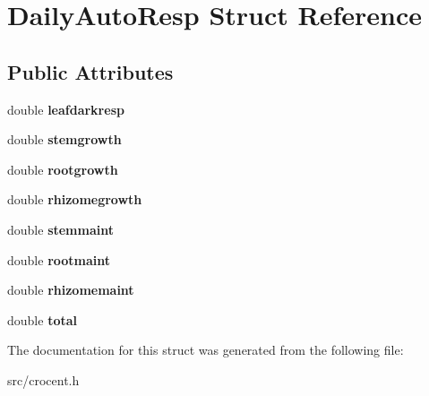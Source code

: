 \hypertarget{struct_daily_auto_resp}{\section{Daily\-Auto\-Resp Struct Reference}
\label{struct_daily_auto_resp}
}
\subsection*{Public Attributes}
\begin{DoxyCompactItemize}
\item 
\hypertarget{struct_daily_auto_resp_a7b3d71eb9710ec545f8c500adc66d3a8}{double {\bfseries leafdarkresp}}\label{struct_daily_auto_resp_a7b3d71eb9710ec545f8c500adc66d3a8}

\item 
\hypertarget{struct_daily_auto_resp_aacbeab3d4a1ce659e2e8c70bb43df8b3}{double {\bfseries stemgrowth}}\label{struct_daily_auto_resp_aacbeab3d4a1ce659e2e8c70bb43df8b3}

\item 
\hypertarget{struct_daily_auto_resp_a25cd37ac3feeff029a906382a25f2789}{double {\bfseries rootgrowth}}\label{struct_daily_auto_resp_a25cd37ac3feeff029a906382a25f2789}

\item 
\hypertarget{struct_daily_auto_resp_acf313fd8f2f08bb90ae009339afa1f68}{double {\bfseries rhizomegrowth}}\label{struct_daily_auto_resp_acf313fd8f2f08bb90ae009339afa1f68}

\item 
\hypertarget{struct_daily_auto_resp_aa02f9f89f49c141780116bd58c87bba7}{double {\bfseries stemmaint}}\label{struct_daily_auto_resp_aa02f9f89f49c141780116bd58c87bba7}

\item 
\hypertarget{struct_daily_auto_resp_a18d9726277242f4eca32d434e8c28460}{double {\bfseries rootmaint}}\label{struct_daily_auto_resp_a18d9726277242f4eca32d434e8c28460}

\item 
\hypertarget{struct_daily_auto_resp_a91f169a87d8f642b777bae26eafb11a5}{double {\bfseries rhizomemaint}}\label{struct_daily_auto_resp_a91f169a87d8f642b777bae26eafb11a5}

\item 
\hypertarget{struct_daily_auto_resp_adc9c45113bc62bb7b974130b863991cb}{double {\bfseries total}}\label{struct_daily_auto_resp_adc9c45113bc62bb7b974130b863991cb}

\end{DoxyCompactItemize}


The documentation for this struct was generated from the following file\-:\begin{DoxyCompactItemize}
\item 
src/crocent.\-h\end{DoxyCompactItemize}
